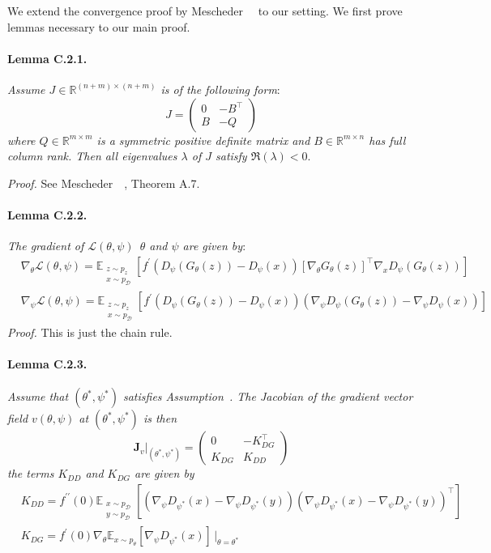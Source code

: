 We extend the convergence proof by Mescheder~\etal~\cite{r1} to our setting. We first prove lemmas necessary to our main proof.

\paragraph{Lemma C.2.1.} \emph{Assume $J\in\mathbb{R}^{(n+m)\times(n+m)}$ is of the following form}:
\begin{equation}
J=\begin{pmatrix}
0 & -B^\top\\ 
B & -Q
\end{pmatrix}
\end{equation}
\emph{where $Q\in\mathbb{R}^{m\times m}$ is a symmetric positive definite matrix and $B\in\mathbb{R}^{m\times n}$ has full column rank. Then all eigenvalues $\lambda$ of $J$ satisfy $\Re(\lambda)< 0$}.

\emph{Proof.} See Mescheder~\etal~\cite{r1}, Theorem A.7.

\paragraph{Lemma C.2.2.} \emph{The gradient of $\mathcal{L}(\theta,\psi)$~\wrt $\theta$ and $\psi$ are given by}:
\begin{align}
&\nabla_\theta\mathcal{L}(\theta,\psi)=\mathbb{E}_{\substack{z\sim p_z\\x\sim p_\mathcal{D}}}[f^\prime(D_\psi(G_\theta(z))-D_\psi(x)) \left[\nabla_\theta G_\theta(z)\right]^\top\nabla_xD_\psi(G_\theta(z))] \\
\label{grad_psi}
&\nabla_\psi\mathcal{L}(\theta,\psi)=\mathbb{E}_{\substack{z\sim p_z\\x\sim p_\mathcal{D}}}[f^\prime(D_\psi(G_\theta(z))-D_\psi(x)) (\nabla_\psi D_\psi(G_\theta(z))-\nabla_\psi D_\psi(x))]
\end{align}
\emph{Proof.} This is just the chain rule.

\paragraph{Lemma C.2.3.} \emph{Assume that $(\theta^*,\psi^*)$ satisfies Assumption~. The Jacobian of the gradient vector field $v(\theta,\psi)$ at $(\theta^*,\psi^*)$ is then}
\begin{equation}
\textbf{J}_v\biggr\rvert_{(\theta^*,\psi^*)}=\begin{pmatrix}
0 & -K^\top_{DG}\\ 
K_{DG} & K_{DD}
\end{pmatrix}
\end{equation}
\emph{the terms $K_{DD}$ and $K_{DG}$ are given by}
\begin{align}
\label{kdd}
&K_{DD}=f^{\prime\prime}(0)\mathbb{E}_{\substack{x\sim p_\mathcal{D}\\y\sim p_\mathcal{D}}}[(\nabla_\psi D_{\psi^*}(x)-\nabla_\psi D_{\psi^*}(y))(\nabla_\psi D_{\psi^*}(x)-\nabla_\psi D_{\psi^*}(y))^\top] \\
\label{kdg}
&K_{DG}=f^\prime(0)\nabla_\theta\mathbb{E}_{x\sim p_\theta}[\nabla_\psi D_{\psi^*}(x)]\,\rvert_{\theta=\theta^*}
\end{align}

